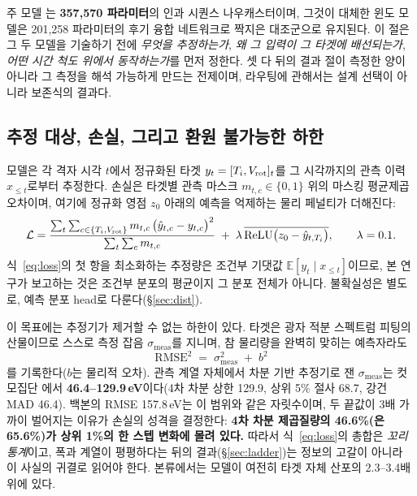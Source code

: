 \documentclass[10pt,a4paper]{article}
\begin{document}
주 모델 \seqv{}는 \textbf{357{,}570 파라미터}의 인과 시퀀스 나우캐스터이며,
그것이 대체한 윈도 모델은 201{,}258 파라미터의 후기 융합 네트워크로 짝지은
대조군으로 유지된다. 이 절은 그 두 모델을 기술하기 전에 \emph{무엇을 추정하는가},
\emph{왜 그 입력이 그 타겟에 배선되는가}, \emph{어떤 시간 척도 위에서 동작하는가}를
먼저 정한다. 셋 다 뒤의 결과 절이 측정한 양이 아니라 그 측정을 해석 가능하게
만드는 전제이며, 라우팅에 관해서는 설계 선택이 아니라 보존식의 결과다.

\subsection{추정 대상, 손실, 그리고 환원 불가능한 하한}
\label{sec:model:target}

모델은 각 격자 시각 $t$에서 정규화된 타겟 $y_t=[T_i,V_\mathrm{rot}]_t$를 그 시각까지의
관측 이력 $x_{\le t}$로부터 추정한다. 손실은 타겟별 관측 마스크
$m_{t,c}\in\{0,1\}$ 위의 마스킹 평균제곱오차이며, 여기에 정규화 영점
$z_0$ 아래의 \Ti{} 예측을 억제하는 물리 페널티가 더해진다:
%
\begin{equation}
  \mathcal{L}
  = \frac{\sum_{t}\sum_{c\in\{T_i,V_\mathrm{rot}\}} m_{t,c}\,\bigl(\hat y_{t,c}-y_{t,c}\bigr)^2}
         {\sum_{t}\sum_{c} m_{t,c}}
  \;+\; \lambda\,\overline{\mathrm{ReLU}\bigl(z_0-\hat y_{t,T_i}\bigr)},
  \qquad \lambda = 0.1 .
  \label{eq:loss}
\end{equation}
%
식~\eqref{eq:loss}의 첫 항을 최소화하는 추정량은 조건부 기댓값
$\mathbb{E}[y_t\mid x_{\le t}]$이므로, 본 연구가 보고하는 것은 조건부 분포의
평균이지 그 분포 전체가 아니다. 불확실성은 별도로, 예측 분포 head로
다룬다(\S\ref{sec:dist}).

이 목표에는 추정기가 제거할 수 없는 하한이 있다. 타겟은 광자 적분 스펙트럼
피팅의 산물이므로 스스로 측정 잡음 $\sigma_\mathrm{meas}$를 지니며, 참 물리량을
완벽히 맞히는 예측자라도
%
\begin{equation}
  \mathrm{RMSE}^2 \;=\; \sigma_\mathrm{meas}^2 \;+\; b^2
  \label{eq:floor}
\end{equation}
%
를 기록한다($b$는 물리적 오차). 관측 계열 자체에서 차분 기반 추정기로 잰
$\sigma_\mathrm{meas}$는 컷 모집단 \Ti{}에서 \textbf{46.4--129.9\,eV}이다(4차
차분 상한 129.9, 상위 5\% 절사 68.7, 강건 MAD 46.4). 백본의 RMSE 157.8\,eV는
이 범위와 같은 자릿수이며, 두 끝값이 3배 가까이 벌어지는 이유가 손실의 성격을
결정한다: \textbf{4차 차분 제곱질량의 46.6\%(\Vrot{}은 65.6\%)가 상위 1\%의
한 스텝 변화에 몰려 있다.} 따라서 식~\eqref{eq:loss}의 총합은 \emph{꼬리
통계}이고, 폭과 계열이 평평하다는 뒤의 결과(\S\ref{sec:ladder})는 정보의 고갈이
아니라 이 사실의 귀결로 읽어야 한다. 본류에서는 모델이 여전히 타겟 자체 산포의
2.3--3.4배 위에 있다.
\end{document}
